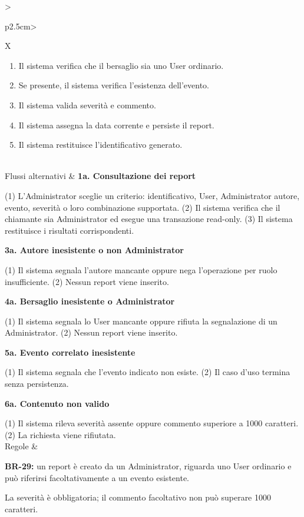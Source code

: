 \begin{tabularx}{\textwidth}{>{\raggedright\arraybackslash\sffamily\bfseries\color{black!75}}p{2.5cm}>{\raggedright\arraybackslash}X}
\begin{minipage}[t]{\linewidth}
\begin{enumerate}[leftmargin=1.4em,nosep,label=\arabic*.]
\item Il sistema verifica che il bersaglio sia uno User ordinario.
\item Se presente, il sistema verifica l'esistenza dell'evento.
\item Il sistema valida severità e commento.
\item Il sistema assegna la data corrente e persiste il report.
\item Il sistema restituisce l'identificativo generato.
\end{enumerate}\vspace{3pt}\end{minipage} \\[2pt] \hline
Flussi alternativi & \textbf{1a. Consultazione dei report} \par (1) L'Administrator sceglie un criterio: identificativo, User, Administrator autore, evento, severità o loro combinazione supportata. (2) Il sistema verifica che il chiamante sia Administrator ed esegue una transazione read-only. (3) Il sistema restituisce i risultati corrispondenti. \par\smallskip \textbf{3a. Autore inesistente o non Administrator} \par (1) Il sistema segnala l'autore mancante oppure nega l'operazione per ruolo insufficiente. (2) Nessun report viene inserito. \par\smallskip \textbf{4a. Bersaglio inesistente o Administrator} \par (1) Il sistema segnala lo User mancante oppure rifiuta la segnalazione di un Administrator. (2) Nessun report viene inserito. \par\smallskip \textbf{5a. Evento correlato inesistente} \par (1) Il sistema segnala che l'evento indicato non esiste. (2) Il caso d'uso termina senza persistenza. \par\smallskip \textbf{6a. Contenuto non valido} \par (1) Il sistema rileva severità assente oppure commento superiore a 1000 caratteri. (2) La richiesta viene rifiutata. \\[2pt] \hline
Regole &\par\smallskip\textbullet{} \textbf{BR-29:} un report è creato da un Administrator, riguarda uno User ordinario e può riferirsi facoltativamente a un evento esistente.\par\smallskip\textbullet{} La severità è obbligatoria; il commento facoltativo non può superare 1000 caratteri. \\[2pt] \hline

\end{tabularx}
